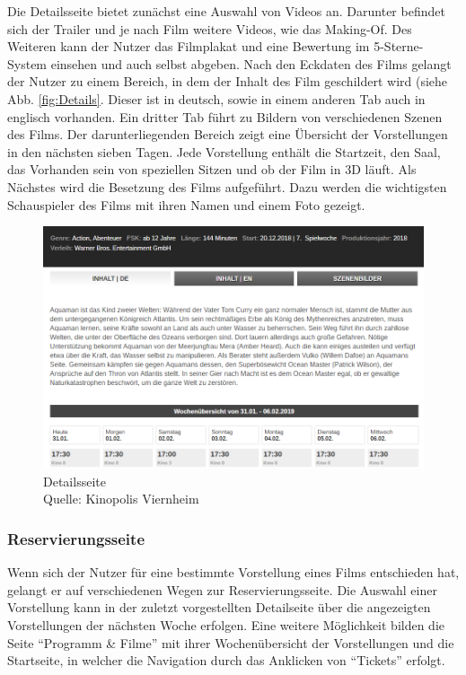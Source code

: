	Die Detailsseite bietet zunächst eine Auswahl von Videos an. Darunter befindet sich der Trailer und je nach Film weitere Videos, wie das Making-Of. Des Weiteren kann der Nutzer das Filmplakat und eine Bewertung im 5-Sterne-System einsehen und auch selbst abgeben. Nach den Eckdaten des Films gelangt der Nutzer zu einem Bereich, in dem der Inhalt des Film geschildert wird (siehe Abb. \vref{fig:Details}. Dieser ist in deutsch, sowie in einem anderen Tab auch in englisch vorhanden. Ein dritter Tab führt zu Bildern von verschiedenen Szenen des Films. Der darunterliegenden Bereich zeigt eine Übersicht der Vorstellungen in den nächsten sieben Tagen. Jede Vorstellung enthält die Startzeit, den Saal, das Vorhanden sein von speziellen Sitzen und ob der Film in 3D läuft. Als Nächstes wird die Besetzung des Films aufgeführt. Dazu werden die wichtigsten Schauspieler des Films mit ihren Namen und einem Foto gezeigt.
	\begin{figure}[H]
		\centering 
		\includegraphics[width=14cm]{img/Detailsseite2.png}
		\captionsetup{format=hang}
		\centering\caption[Startseite von Kinopolis Viernheim]{\label{fig:Details}Detailsseite \\Quelle: Kinopolis Viernheim}
	\end{figure}  
	
	\subsubsection{Reservierungsseite}
	Wenn sich der Nutzer für eine bestimmte Vorstellung eines Films entschieden hat, gelangt er auf verschiedenen Wegen zur Reservierungsseite. Die Auswahl einer Vorstellung kann in der zuletzt vorgestellten Detailseite über die angezeigten Vorstellungen der nächsten Woche erfolgen. Eine weitere Möglichkeit bilden die Seite \enquote{Programm \& Filme} mit ihrer Wochenübersicht der Vorstellungen und die Startseite, in welcher die Navigation durch das Anklicken von \enquote{Tickets} erfolgt. 
	

